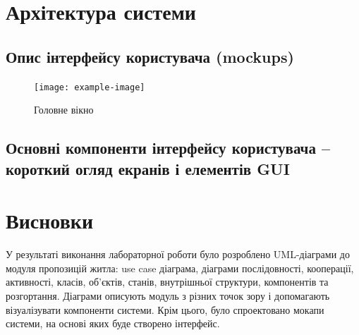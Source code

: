 \documentclass[oneside,14pt]{extarticle}
\begin{document}
\begin{normalsize}
	\section{Архітектура системи}
	\subsection{Опис інтерфейсу користувача (mockups)}
	\begin{figure}[H]
		\centering
		\texttt{[image: example-image]}
		\caption{Головне вікно}
	\end{figure}
	
	\subsection{Основні компоненти інтерфейсу користувача – короткий огляд екранів і елементів GUI}
	
	\section*{Висновки}
	У результаті виконання лабораторної роботи було розроблено UML-діаграми до модуля пропозицій житла: use case діаграма, діаграми послідовності, кооперації, активності, класів, об’єктів, станів, внутрішньої структури, компонентів та розгортання. Діаграми описують модуль з різних точок зору і допомагають візуалізувати компоненти системи. Крім цього, було спроектовано мокапи системи, на основі яких буде створено інтерфейс.
	    
\end{normalsize}
\end{document}
